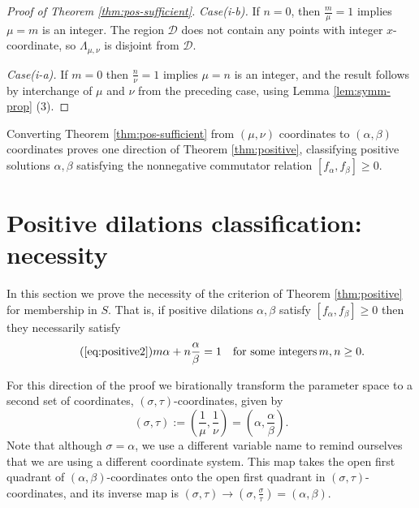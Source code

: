 \documentclass[11pt, letterpaper, reqno]{amsart}
\theoremstyle{definition}
\numberwithin{equation}{section}
\newcommand{\um}{{\mu}}
\newcommand{\vm}{{\nu}}
\newcommand{\cD}{\mathcal{D}}
\newcommand{\talpha}{{\sigma}}
\newcommand{\trho}{{\tau}}
\begin{document}
{\begin{proof}[Proof of  Theorem \ref{thm:pos-sufficient}]
{\em Case(i-b).} If $n = 0$, then $\frac{m}{\um} = 1$ implies $\um= m$ is an integer. 
The region $\cD$ does not contain any points with integer $x$-coordinate, 
so $\Lambda_{\um,\vm}$ is disjoint from $\cD$. 

{\em Case(i-a).} If $m=0$ then $\frac{n}{\vm} = 1$ implies $\um = n$ is an integer, and the result follows by interchange of $\um$ and $\vm$ from the preceding case, using Lemma \ref{lem:symm-prop} (3). 
\end{proof}

Converting Theorem \ref{thm:pos-sufficient} from $(\um,\vm)$ coordinates  to $(\alpha,\beta)$ coordinates
 proves one direction of Theorem \ref{thm:positive}, 
 classifying positive solutions $\alpha,\beta$  satisfying 
 the nonnegative commutator relation $[f_\alpha,f_\beta]\geq 0$.


%
%
\section{Positive dilations classification: necessity}
\label{sec:positive-N}
\setcounter{equation}{0}
In this section we prove the necessity of the criterion  of Theorem \ref{thm:positive}
for membership in $S$.
That is,  if positive dilations $\alpha, \beta$ satisfy $[f_\alpha, f_\beta] \geq 0$
then they necessarily  satisfy
\begin{equation}
\tag{\ref{eq:positive2}}
 m\alpha + n\frac{\alpha}{\beta} = 1 \quad\text{for some integers} \, m,n\geq 0.
\end{equation}


For this direction  of the proof we birationally transform the parameter space to 
a second set of coordinates, $(\talpha, \trho)$-coordinates, given by
\begin{equation}
(\talpha, \trho) := (\frac{1}{\um}, \frac{1}{\vm})= (\alpha, \frac{\alpha}{\beta}).
\end{equation}
Note that although $\talpha = \alpha$, 
we use a different variable name to remind ourselves that we are using a different coordinate system.
This map takes the open first quadrant of $(\alpha, \beta)$-coordinates onto the open first quadrant
in $(\talpha, \trho)$-coordinates, and its inverse map is  
$(\talpha, \trho) \to  (\talpha, \frac{\talpha}{\trho})= (\alpha, \beta)$.

}
\end{document}
